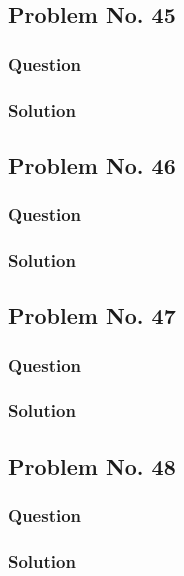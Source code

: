 \documentclass[journal,12pt,twocolumn]{IEEEtran}
\begin{document}
\subsection{Problem No. 45}
\subsubsection{Question}

\subsubsection{Solution}


\subsection{Problem No. 46}
\subsubsection{Question}

\subsubsection{Solution}


\subsection{Problem No. 47}
\subsubsection{Question}

\subsubsection{Solution}


\subsection{Problem No. 48}
\subsubsection{Question}

\subsubsection{Solution}

\end{document}
